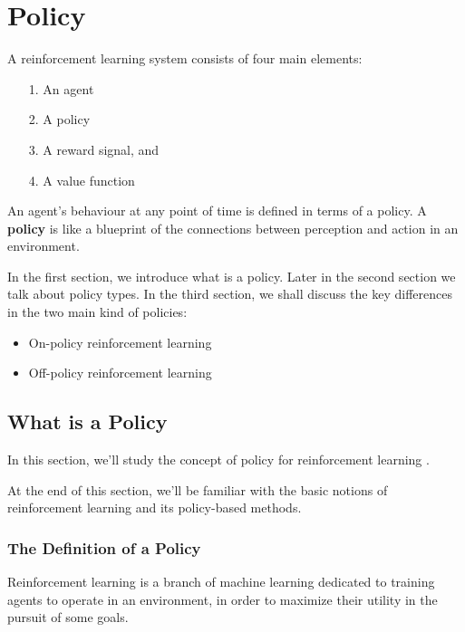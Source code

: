 

\chapter{Policy}

A reinforcement learning system consists of four main elements:
\begin{itemize}
\setlength{\parskip}{0pt}
\item[1.]
An agent
\item[2.]
A policy 
\item[3.]
A reward signal, and 
\item[4.]
A value function
\end{itemize}

An agent's behaviour at any point of time is defined in terms 
of a policy. A {\bf policy} is like a blueprint of the connections 
between perception and action in an environment.  

In the first section, we introduce what is a policy.
Later in the second section we talk about policy types.
In the third section, we shall discuss the key differences 
in the two main kind of policies: 
\begin{itemize}
\item On-policy reinforcement learning
\item Off-policy reinforcement learning
\end{itemize}

\section{What is a Policy}

In this section, we'll study the concept of policy for 
reinforcement learning\cite{Gabriele2020}
\parencite{Gabriele2020}
.

At the end of this section, we'll be familiar with the basic 
notions of reinforcement learning and its policy-based methods.

\subsection{The Definition of a Policy}

Reinforcement learning is a branch of machine learning 
dedicated to training agents to operate in an environment, 
in order to maximize their utility in the pursuit of some 
goals.

